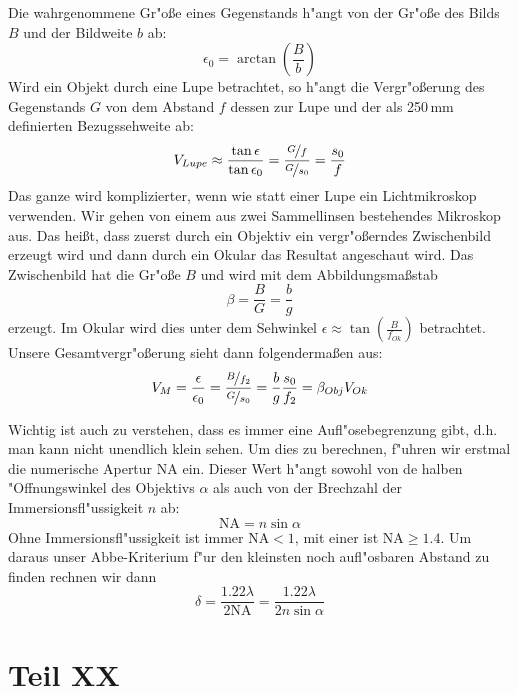 \documentclass[11pt,a4paper]{article}
\begin{document}
Die wahrgenommene Gr"o\ss e eines Gegenstands h"angt von der Gr"o\ss e des Bilds $B$ und der Bildweite $b$ ab:
\begin{equation}
\epsilon_0=\arctan\left(\frac{B}{b}\right)\label{eq:1}
\end{equation}
Wird ein Objekt durch eine Lupe betrachtet, so h"angt die Vergr"o\ss erung des Gegenstands $G$ von dem Abstand $f$ dessen zur Lupe und der als 250\,mm definierten Bezugssehweite ab:
\begin{equation}
V_{Lupe}\approx\frac{\tan\epsilon}{\tan\epsilon_0}=\frac{\nicefrac{G}{f}}{\nicefrac{G}{s_0}}=\frac{s_0}{f}\label{eq:3}
\end{equation}
Das ganze wird komplizierter, wenn wie statt einer Lupe ein Lichtmikroskop verwenden. Wir gehen von einem aus zwei Sammellinsen bestehendes Mikroskop aus. Das hei\ss t, dass zuerst durch ein Objektiv ein vergr"o\ss erndes Zwischenbild erzeugt wird und dann durch ein Okular das Resultat angeschaut wird. Das Zwischenbild hat die Gr"o\ss e $B$ und wird mit dem Abbildungsma\ss stab
\begin{equation}
\beta=\frac{B}{G}=\frac{b}{g}\label{eq:4}
\end{equation}
erzeugt. Im Okular wird dies unter dem Sehwinkel $\epsilon\approx\tan\left(\frac{B}{f_{Ok}}\right)$ betrachtet. Unsere Gesamtvergr"o\ss erung sieht dann folgenderma\ss en aus:
\begin{equation}
V_M=\frac{\epsilon}{\epsilon_0}=\frac{\nicefrac{B}{f_2}}{\nicefrac{G}{s_0}}=\frac{b}{g}\frac{s_0}{f_2}=\beta_{Obj}V_{Ok}\label{eq:5}
\end{equation}

Wichtig ist auch zu verstehen, dass es immer eine Aufl"osebegrenzung gibt, d.h. man kann nicht unendlich klein sehen. Um dies zu berechnen, f"uhren wir erstmal die numerische Apertur NA ein. Dieser Wert h"angt sowohl von de halben "Offnungswinkel des Objektivs $\alpha$ als auch von der Brechzahl der Immersionsfl"ussigkeit $n$ ab:
\begin{equation}
\mathrm{NA}=n\sin\alpha\label{eq:7}
\end{equation}
Ohne Immersionsfl"ussigkeit ist immer NA$<1$, mit einer ist NA$\geq1.4$.
Um daraus unser Abbe-Kriterium f"ur den kleinsten noch aufl"osbaren Abstand zu finden rechnen wir dann
\begin{equation}
\delta=\frac{1.22\lambda}{2\mathrm{NA}}=\frac{1.22\lambda}{2n\sin\alpha}\label{eq:8}
\end{equation}

\section{Teil XX}
\end{document}
